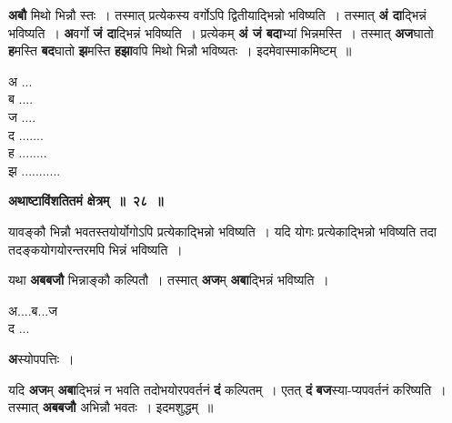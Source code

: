 \documentclass[11pt, openany]{book}
\begin{document}
\begin{flushleft}
\begin{minipage}[t]{0.7\textwidth}
\hspace{4mm} \textbf{अबौ} मिथो भिन्नौ स्तः~। तस्मात् प्रत्येकस्य वर्गोऽपि द्वितीयाद्भिन्नो भविष्यति~। तस्मात् \textbf{अं दा}द्भिन्नं भविष्यति~। \textbf{अ}वर्गो \textbf{जं दा}द्भिन्नं भविष्यति~। प्रत्येकम् \textbf{अं जं बदा}भ्यां भिन्नमस्ति~। तस्मात् \textbf{अज}घातो \textbf{ह}मस्ति \textbf{बद}घातो \textbf{झ}मस्ति \textbf{हझा}वपि मिथो भिन्नौ भविष्यतः~। इदमेवास्माकमिष्टम्~॥
\end{minipage} 
\hfill
\begin{minipage}[t]{0.2\textwidth}
\vspace{-8mm}

अ ... \\
ब .... \\
ज ....\\
द .......\\
ह ........\\
झ ...........
\end{minipage}
\end{flushleft}

\newpage
\begin{center}
\textbf{\large अथाष्टाविंशतितमं क्षेत्रम्~॥~२८~॥}
\end{center}

{\ab यावङ्कौ भिन्नौ भवतस्तयोर्योगोऽपि प्रत्येकाद्भिन्नो भविष्यति~। यदि योगः प्रत्येकाद्भिन्नो भविष्यति तदा तदङ्कयोगयोरन्तरमपि भिन्नं भविष्यति~।} 

\begin{flushleft}
\begin{minipage}[t]{0.6\textwidth}
\hspace{4mm} यथा \textbf{अबबजौ} भिन्नाङ्कौ कल्पितौ~। तस्मात् \textbf{अज}म् \textbf{अबा}द्भिन्नं भविष्यति~।
\end{minipage} 
\hfill
\begin{minipage}[t]{0.25\textwidth}
अ....ब...ज\\
द ...
\end{minipage}
\end{flushleft}
\vspace{-1mm}

\begin{center}
{\textbf अस्योपपत्तिः~। }
\end{center}

यदि \textbf{अज}म् \textbf{अबा}द्भिन्नं न भवति तदोभयोरपवर्तनं \textbf{दं} कल्पितम्~। एतत् \textbf{दं} \textbf{बज}स्या-प्यपवर्तनं करिष्यति~। तस्मात् \textbf{अबबजौ} अभिन्नौ भवतः~। इदमशुद्धम्~॥ \\
\vspace{-1mm}
\end{document}
